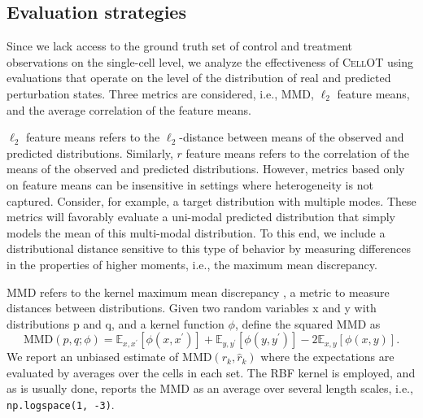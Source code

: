 \subsection{Evaluation strategies}
Since we lack access to the ground truth set of control and treatment observations on the single-cell level,
we analyze the effectiveness of \textsc{CellOT} using evaluations that operate on the level of the distribution of real and predicted perturbation states.
Three metrics are considered, i.e., MMD, $\ell_2$ feature means, and the average correlation of the feature means.

$\ell_2$ feature means refers to the $\ell_2$-distance between means of the observed and predicted distributions. Similarly, $r$ feature means refers to the correlation of the means of the observed and predicted distributions.
However, metrics based only on feature means can be insensitive in settings where heterogeneity is not captured. Consider, for example, a target distribution with multiple modes. These metrics will favorably evaluate a uni-modal predicted distribution that simply models the mean of this multi-modal distribution. To this end, we include a distributional distance sensitive to this type of behavior by measuring differences in the properties of higher moments, i.e., the maximum mean discrepancy.

MMD refers to the kernel maximum mean discrepancy \citep{gretton2012kernel}, a metric to measure distances between distributions.
Given two random variables x and y with distributions p and q, and a kernel function $\phi$, \citet{gretton2012kernel} define the squared MMD as
\begin{equation*}
    \text{MMD}(p, q; \phi) = \mathbb{E}_{x,x^\prime}[\phi(x, x^\prime)] + \mathbb{E}_{y,y^\prime}[\phi(y, y^\prime)] - 2\mathbb{E}_{x,y}[\phi(x, y)].
\end{equation*}
We report an unbiased estimate of $\text{MMD}(r_k, \hat{r}_k)$ where the expectations are evaluated by averages over the cells in each set. The RBF kernel is employed, and as is usually done, reports the MMD as an average over several length scales, i.e., \texttt{np.logspace(1, -3)}.

